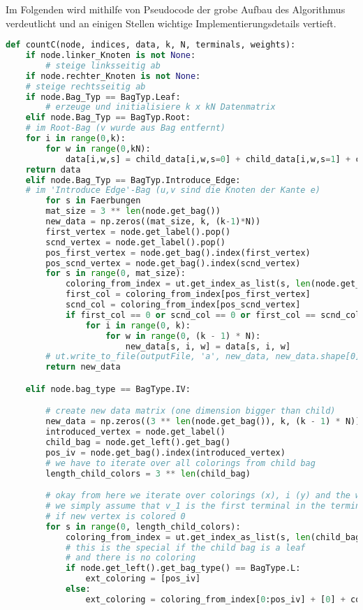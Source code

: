 Im Folgenden wird mithilfe von Pseudocode der grobe Aufbau des Algorithmus verdeutlicht und an einigen Stellen wichtige Implementierungsdetails vertieft.

\begin{svgraybox}
\begin{lstlisting}[language=python]
def countC(node, indices, data, k, N, terminals, weights):
    if node.linker_Knoten is not None:
        # steige linksseitig ab
    if node.rechter_Knoten is not None:
	# steige rechtsseitig ab
    if node.Bag_Typ == BagTyp.Leaf:
    	# erzeuge und initialisiere k x kN Datenmatrix
    elif node.Bag_Typ == BagTyp.Root:
	# im Root-Bag (v wurde aus Bag entfernt)
	for i in range(0,k):
		for w in range(0,kN):
			data[i,w,s] = child_data[i,w,s=0] + child_data[i,w,s=1] + child_data[i,w,s=2]
	return data			
    elif node.Bag_Typ == BagTyp.Introduce_Edge:
	# im 'Introduce Edge'-Bag (u,v sind die Knoten der Kante e)
		for s in Faerbungen
        mat_size = 3 ** len(node.get_bag())
        new_data = np.zeros((mat_size, k, (k-1)*N))
        first_vertex = node.get_label().pop()
        scnd_vertex = node.get_label().pop()
        pos_first_vertex = node.get_bag().index(first_vertex)
        pos_scnd_vertex = node.get_bag().index(scnd_vertex)
        for s in range(0, mat_size):
            coloring_from_index = ut.get_index_as_list(s, len(node.get_bag()))
            first_col = coloring_from_index[pos_first_vertex]
            scnd_col = coloring_from_index[pos_scnd_vertex]
            if first_col == 0 or scnd_col == 0 or first_col == scnd_col:
                for i in range(0, k):
                    for w in range(0, (k - 1) * N):
                        new_data[s, i, w] = data[s, i, w]
        # ut.write_to_file(outputFile, 'a', new_data, new_data.shape[0], str(node.bag_type) + str(node.get_bag()))
        return new_data

    elif node.bag_type == BagType.IV:

        # create new data matrix (one dimension bigger than child)
        new_data = np.zeros((3 ** len(node.get_bag()), k, (k - 1) * N))
        introduced_vertex = node.get_label()
        child_bag = node.get_left().get_bag()
        pos_iv = node.get_bag().index(introduced_vertex)
        # we have to iterate over all colorings from child bag
        length_child_colors = 3 ** len(child_bag)

        # okay from here we iterate over colorings (x), i (y) and the weights (z)
        # we simply assume that v_1 is the first terminal in the terminals array
        # if new vertex is colored 0
        for s in range(0, length_child_colors):
            coloring_from_index = ut.get_index_as_list(s, len(child_bag))
            # this is the special if the child bag is a leaf
            # and there is no coloring
            if node.get_left().get_bag_type() == BagType.L:
                ext_coloring = [pos_iv]
            else:
                ext_coloring = coloring_from_index[0:pos_iv] + [0] + coloring_from_index[pos_iv:]


\end{lstlisting}
\end{svgraybox}

